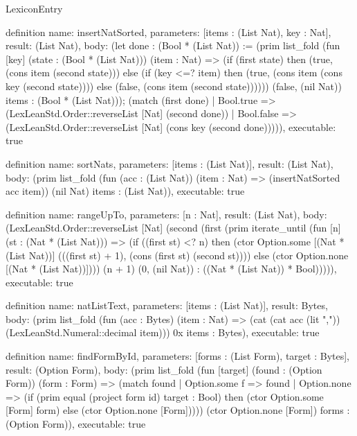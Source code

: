 \begin{lexlean}{LexiconEntry}
\begin{semanticmodule}
definition{
  name: insertNatSorted,
  parameters: [items : (List Nat), key : Nat],
  result: (List Nat),
  body: (let done : (Bool * (List Nat)) := (prim list_fold (fun [key] (state : (Bool * (List Nat))) (item : Nat) => (if (first state) then (true, (cons item (second state))) else (if (key <=? item) then (true, (cons item (cons key (second state)))) else (false, (cons item (second state)))))) (false, (nil Nat)) items : (Bool * (List Nat))); (match (first done)
    | Bool.true => (LexLeanStd.Order::reverseList [Nat] (second done))
    | Bool.false => (LexLeanStd.Order::reverseList [Nat] (cons key (second done))))),
  executable: true
}

definition{
  name: sortNats,
  parameters: [items : (List Nat)],
  result: (List Nat),
  body: (prim list_fold (fun (acc : (List Nat)) (item : Nat) => (insertNatSorted acc item)) (nil Nat) items : (List Nat)),
  executable: true
}

definition{
  name: rangeUpTo,
  parameters: [n : Nat],
  result: (List Nat),
  body: (LexLeanStd.Order::reverseList [Nat] (second (first (prim iterate_until (fun [n] (st : (Nat * (List Nat))) => (if ((first st) <? n) then (ctor Option.some [(Nat * (List Nat))] (((first st) + 1), (cons (first st) (second st)))) else (ctor Option.none [(Nat * (List Nat))]))) (n + 1) (0, (nil Nat)) : ((Nat * (List Nat)) * Bool))))),
  executable: true
}

definition{
  name: natListText,
  parameters: [items : (List Nat)],
  result: Bytes,
  body: (prim list_fold (fun (acc : Bytes) (item : Nat) => (cat (cat acc (lit ",")) (LexLeanStd.Numeral::decimal item))) 0x items : Bytes),
  executable: true
}

definition{
  name: findFormById,
  parameters: [forms : (List Form), target : Bytes],
  result: (Option Form),
  body: (prim list_fold (fun [target] (found : (Option Form)) (form : Form) => (match found
    | Option.some f => found
    | Option.none => (if (prim equal (project form id) target : Bool) then (ctor Option.some [Form] form) else (ctor Option.none [Form])))) (ctor Option.none [Form]) forms : (Option Form)),
  executable: true
}


\end{semanticmodule}
\end{lexlean}
